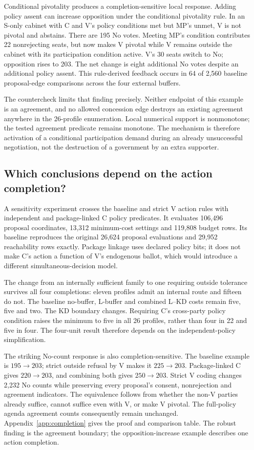 \documentclass[11pt,a4paper]{article}
\begin{document}
Conditional pivotality produces a completion-sensitive local response. Adding policy assent can increase opposition under the conditional pivotality rule. In an S-only cabinet with C and V's policy conditions met but MP's unmet, V is not pivotal and abstains. There are 195 No votes. Meeting MP's condition contributes 22 nonrejecting seats, but now makes V pivotal while V remains outside the cabinet with its participation condition active. V's 30 seats switch to No; opposition rises to 203. The net change is eight additional No votes despite an additional policy assent. This rule-derived feedback occurs in 64 of 2,560 baseline proposal-edge comparisons across the four external buffers.

The countercheck limits that finding precisely. Neither endpoint of this example is an agreement, and no allowed concession edge destroys an existing agreement anywhere in the 26-profile enumeration. Local numerical support is nonmonotone; the tested agreement predicate remains monotone. The mechanism is therefore activation of a conditional participation demand during an already unsuccessful negotiation, not the destruction of a government by an extra supporter.

\subsection{Which conclusions depend on the action completion?}

A sensitivity experiment crosses the baseline and strict V action rules with independent and package-linked C policy predicates. It evaluates 106,496 proposal coordinates, 13,312 minimum-cost settings and 119,808 budget rows. Its baseline reproduces the original 26,624 proposal evaluations and 29,952 reachability rows exactly. Package linkage uses declared policy bits; it does not make C's action a function of V's endogenous ballot, which would introduce a different simultaneous-decision model.

The change from an internally sufficient family to one requiring outside tolerance survives all four completions: eleven profiles admit an internal route and fifteen do not. The baseline no-buffer, L-buffer and combined L--KD costs remain five, five and two. The KD boundary changes. Requiring C's cross-party policy condition raises the minimum to five in all 26 profiles, rather than four in 22 and five in four. The four-unit result therefore depends on the independent-policy simplification.

The striking No-count response is also completion-sensitive. The baseline example is \(195\to203\); strict outside refusal by V makes it \(225\to203\). Package-linked C gives \(220\to203\), and combining both gives \(250\to203\). Strict V coding changes 2,232 No counts while preserving every proposal's consent, nonrejection and agreement indicators. The equivalence follows from whether the non-V parties already suffice, cannot suffice even with V, or make V pivotal. The full-policy agenda agreement counts consequently remain unchanged. Appendix~\ref{app:completion} gives the proof and comparison table. The robust finding is the agreement boundary; the opposition-increase example describes one action completion.
\end{document}
